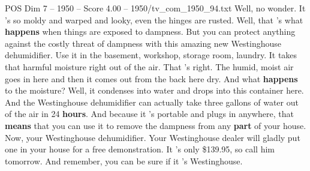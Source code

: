 \begin{textsample}{POS Dim 7 – 1950 – Score 4.00 – 1950/tv\_com\_1950\_94.txt}  \label{ex:f7_pos_006}
Well, no wonder.
It 's so moldy and warped and looky, even the hinges are rusted.
Well, that 's what \textbf{happens} when things are exposed to dampness.
But you can protect anything against the costly threat of dampness with this amazing new Westinghouse dehumidifier.
Use it in the basement, workshop, storage room, laundry.
It takes that harmful moisture right out of the air.
That 's right.
The humid, moist air goes in here and then it comes out from the back here dry.
And what \textbf{happens} to the moisture?
Well, it condenses into water and drops into this container here.
And the Westinghouse dehumidifier can actually take three gallons of water out of the air in 24 \textbf{hours}.
And because it 's portable and plugs in anywhere, that \textbf{means} that you can use it to remove the dampness from any \textbf{part} of your house.
Now, your Westinghouse dehumidifier.
Your Westinghouse dealer will gladly put one in your house for a free demonstration.
It 's only \$139.95, so call him tomorrow.
And remember, you can be sure if it 's Westinghouse.

\end{textsample}
